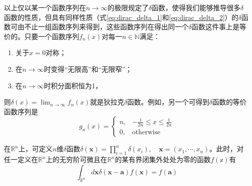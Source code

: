 \documentclass[main.tex]{subfiles}
\begin{document}
以上仅以某一个函数序列在$n\rightarrow\infty$的极限规定了$\delta$函数，使得我们能够推导很多$\delta$函数的性质，但具有同样性质（式\eqref{eq:dirac_delta_1}和\eqref{eq:dirac_delta_2}）的$\delta$函数可由不止一组函数序列来得到，这些函数序列在得出同一个$\delta$函数这件事上是等价的。只要一个函数序列$f_n\left(x\right)$对每一$n\in\mathbb{N}$满足：
\begin{enumerate}
    \item 关于$x=0$对称；
    \item 在$n\rightarrow\infty$时变得“无限高”和“无限窄”；
    \item 在$n\rightarrow\infty$时积分面积恒为1，
\end{enumerate}
则$\delta\left(x\right)=\lim_{n\to\infty}f_n\left(x\right)$就是狄拉克$\delta$函数。例如，另一个可得到$\delta$函数的等价函数序列是
\[
    g_n\left(x\right)=\left\{\begin{array}{ll}
        n, & -\frac{1}{2n}\leq x\leq\frac{1}{2n} \\
        0, & \text{otherwise}\end{array}\right.
\]

在$\mathbb{R}^n$上，可定义$n$维$\delta$函数$\delta\left(\mathbf{x}\right)=\prod_{i=1}^n\delta\left(x_i\right),\quad \mathbf{x}=\left(x_1,\cdots,x_n\right)$。此时，对任一定义在$\mathbb{R}^n$上的无穷阶可微且在$\mathbb{R}^n$的某有界闭集外处处为零的函数$f\left(\mathbb{x}\right)$有
\begin{equation}\label{eq:dirac_delta_3}
    \int_{\mathbb{R}^n}d\mathbf{x}\delta\left(\mathbf{x}-\mathbf{a}\right)f\left(\mathbf{x}\right)=f\left(\mathbf{a}\right)
\end{equation}
\end{document}
